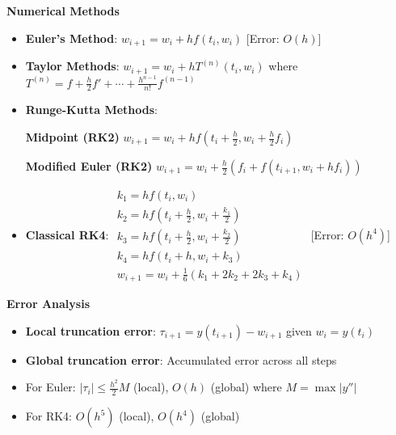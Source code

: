 \documentclass{article}
\begin{document}
\begin{minipage}[t]{0.49\textwidth}
\textbf{Numerical Methods}
\begin{itemize}
\item \textbf{Euler's Method}: $w_{i+1} = w_i + hf(t_i,w_i)$ [Error: $O(h)$]
\item \textbf{Taylor Methods}: $w_{i+1} = w_i + hT^{(n)}(t_i,w_i)$ where 
$T^{(n)} = f + \frac{h}{2}f' + \cdots + \frac{h^{n-1}}{n!}f^{(n-1)}$
\item \textbf{Runge-Kutta Methods}:
\begin{minipage}[t]{0.45\textwidth}
    \textbf{Midpoint (RK2)}
    $w_{i+1} = w_i + hf(t_i+\frac{h}{2}, w_i+\frac{h}{2}f_i)$
\end{minipage}
\hfill
\begin{minipage}[t]{0.45\textwidth}
    \textbf{Modified Euler (RK2)}
    $w_{i+1} = w_i + \frac{h}{2}(f_i + f(t_{i+1},w_i+hf_i))$
\end{minipage}

\item \textbf{Classical RK4}:
$\begin{array}{l}
k_1 = hf(t_i,w_i) \\
k_2 = hf(t_i+\frac{h}{2},w_i+\frac{k_1}{2}) \\
k_3 = hf(t_i+\frac{h}{2},w_i+\frac{k_2}{2}) \\
k_4 = hf(t_i+h,w_i+k_3) \\
w_{i+1} = w_i + \frac{1}{6}(k_1 + 2k_2 + 2k_3 + k_4)
\end{array}$
[Error: $O(h^4)$]
\end{itemize}

\textbf{Error Analysis}
\begin{itemize}
\item \textbf{Local truncation error}: $\tau_{i+1} = y(t_{i+1}) - w_{i+1}$ given $w_i = y(t_i)$
\item \textbf{Global truncation error}: Accumulated error across all steps
\item For Euler: $|\tau_i| \leq \frac{h^2}{2}M$ (local), $O(h)$ (global) where $M = \max|y''|$
\item For RK4: $O(h^5)$ (local), $O(h^4)$ (global)
\end{itemize}

\end{minipage}
\hfill
\end{document}
